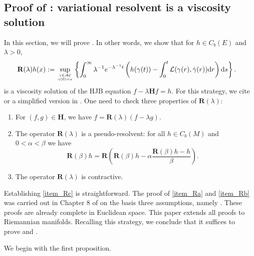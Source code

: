 \documentclass[a4paper]{article}
\numberwithin{equation}{section}
\theoremstyle{definition}
\begin{document}
\subsection{Proof of : variational resolvent is a viscosity solution}\label{sec:variational resolvent is a viscosity solution}
In this section, we will prove 
. In other words, we show that for $h\in C_b(E)$ and $\lambda>0$, 
\begin{equation*}
\begin{split}
	\mathbf{R}(\lambda)h(x):=\sup_{\gamma\in \mathcal{AC}\atop \gamma(0)=x}\left\{\int^\infty_0 \lambda^{-1}e^{-\lambda^{-1}t}\left(h(\gamma(t))-\int^t_0\mathcal{L}(\gamma(r),\dot{\gamma} (r))\mathrm{d}r\right)\mathrm{d}s\right\}.
 \end{split}
\end{equation*} is a viscosity solution of the HJB equation $f-\lambda \mathbf{H}f=h$. For this strategy, we cite  \cite[Chapter 8]{FK2006} or a simplified version in \cite[Section 4]{KS2021}.
One need to check three properties of $\mathbf{R}(\lambda)$:
\begin{enumerate}
    \item \label{item_Ra} For $(f,g)\in \mathbf{H}$, we have $f=\mathbf{R}(\lambda)(f-\lambda g)$.
    \item \label{item_Rb} The operator $\mathbf{R}(\lambda)$ is a pseudo-resolvent: for all $h\in C_b(M)$ and $0<\alpha<\beta$ we have
    \begin{equation*}
        \mathbf{R}(\beta)h= \mathbf{R}\left(\mathbf{R}(\beta)h-\alpha \frac{\mathbf{R}(\beta)h-h}{\beta}\right).
    \end{equation*}
    \item \label{item_Rc} The operator $\mathbf{R}(\lambda)$ is contractive.
\end{enumerate}
Establishing \cref{item_Rc} is straightforward. The proof of \cref{item_Ra} and \cref{item_Rb} was carried out in Chapter 8 of \cite{FK2006} on the basis three assumptions, namely \cite[Assumptions 8.9,8.10 and 8.11]{FK2006}. These proofs are already complete in Euclidean space. This paper extends all proofs to Riemannian manifolds. Recalling this strategy, we conclude that it suffices to prove 
 and .
\par
We begin with the first proposition.
\end{document}
